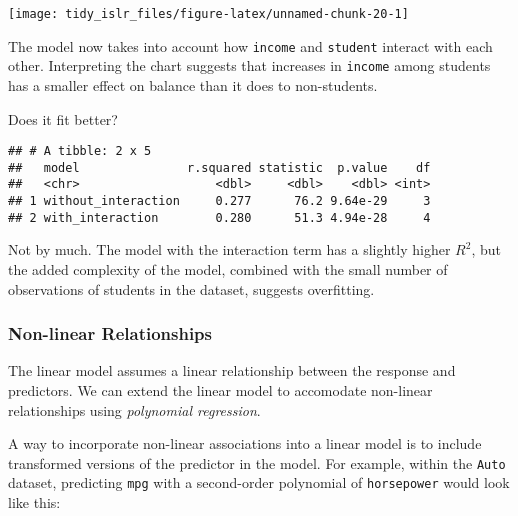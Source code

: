 \documentclass[]{book}
\newenvironment{Shaded}{\begin{snugshade}}{\end{snugshade}}
\newcommand{\DataTypeTok}[1]{\textcolor[rgb]{0.13,0.29,0.53}{#1}}
\newcommand{\KeywordTok}[1]{\textcolor[rgb]{0.13,0.29,0.53}{\textbf{#1}}}
\newcommand{\NormalTok}[1]{#1}
\newcommand{\OperatorTok}[1]{\textcolor[rgb]{0.81,0.36,0.00}{\textbf{#1}}}
\newcommand{\StringTok}[1]{\textcolor[rgb]{0.31,0.60,0.02}{#1}}
\begin{document}
\begin{center}\texttt{[image: tidy\_islr\_files/figure-latex/unnamed-chunk-20-1]} \end{center}

The model now takes into account how \texttt{income} and \texttt{student} interact with each other. Interpreting the chart suggests that increases in \texttt{income} among students has a smaller effect on balance than it does to non-students.

Does it fit better?

\begin{Shaded}
\end{Shaded}

\begin{verbatim}
## # A tibble: 2 x 5
##   model               r.squared statistic  p.value    df
##   <chr>                   <dbl>     <dbl>    <dbl> <int>
## 1 without_interaction     0.277      76.2 9.64e-29     3
## 2 with_interaction        0.280      51.3 4.94e-28     4
\end{verbatim}

Not by much. The model with the interaction term has a slightly higher \(R^2\), but the added complexity of the model, combined with the small number of observations of students in the dataset, suggests overfitting.

\hypertarget{non-linear-relationships}{%
\subsubsection{Non-linear Relationships}\label{non-linear-relationships}}

The linear model assumes a linear relationship between the response and predictors. We can extend the linear model to accomodate non-linear relationships using \emph{polynomial regression}.

A way to incorporate non-linear associations into a linear model is to include transformed versions of the predictor in the model. For example, within the \texttt{Auto} dataset, predicting \texttt{mpg} with a second-order polynomial of \texttt{horsepower} would look like this:
\end{document}
